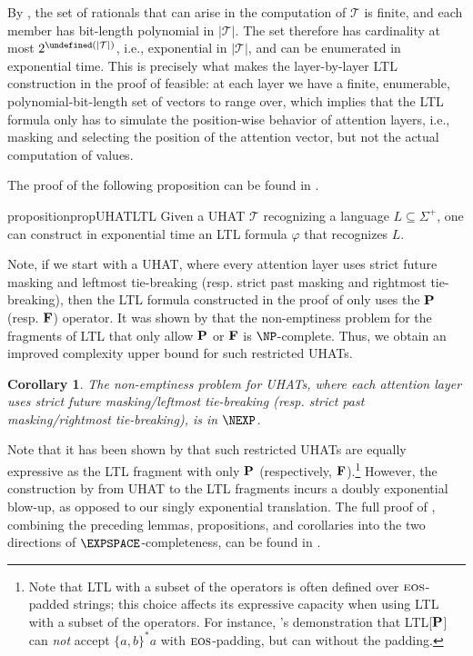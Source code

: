 \documentclass{article} %
\newtheorem{corollary}[theorem]{Corollary}
\newcommand{\opbf}[1]{\textnormal{\textbf{#1}}}
\newcommand{\past}{\opbf{P}}
\newcommand{\future}{\opbf{F}}
\let\poly\undefined
\DeclareMathOperator{\poly}{poly}
\newcommand{\alphabet}{\Sigma}
\newcommand{\trans}{\mathcal{T}}
\newcommand{\Lang}{L}
\newcommand{\citeposs}[1]{\citeauthor{#1}'s \citeyearpar{#1}}
\newcommand{\kplus}{^+}
\begin{document}
By , the set of rationals that can arise in the computation of $\trans$ is finite, and each member has bit-length polynomial in $|\trans|$.
The set therefore has cardinality at most $2^{\poly(|\trans|)}$, i.e., exponential in $|\trans|$, and can be enumerated in exponential time. 
This is precisely what makes the layer-by-layer LTL construction in the proof of  feasible: at each layer we have a finite, enumerable, polynomial-bit-length set of vectors to range over, which implies that the LTL formula only has to simulate the position-wise behavior of attention layers, i.e.,
masking and selecting the position of the attention vector,
but not the actual computation of values.

The proof of the following proposition can be found in .
\begin{restatable}[]{proposition}{propUHATLTL}\label{prop:UHAT-LTL}
Given a UHAT $\trans$ recognizing a language $\Lang \subseteq \alphabet\kplus$, one can construct in exponential time an LTL formula $\varphi$ that recognizes $\Lang$.
\end{restatable}


Note, if we start with a UHAT, where every attention layer uses strict future masking and leftmost tie-breaking (resp. strict past masking and rightmost tie-breaking),
then the LTL formula constructed in the proof of  only uses the $\past$ (resp. $\future$) operator.
It was shown by \citet{SistlaC85} that the non-emptiness problem for the fragments of LTL
that only allow $\past$ or $\future$ is $\NP$-complete.
Thus, we obtain an improved complexity upper bound for such restricted UHATs.
\begin{corollary}
The non-emptiness problem for UHATs, where each attention layer uses strict future masking/leftmost tie-breaking
(resp. strict past masking/rightmost tie-breaking), is in $\NEXP$.
\end{corollary}

Note that it has been shown by \citet{tale} that such restricted UHATs
are equally expressive as the LTL fragment with only $\past$ (respectively, $\future$).\footnote{Note that LTL with a subset of the operators is often defined over $\textsc{eos}$-padded strings; this choice affects its expressive capacity when using LTL with a subset of the operators. 
For instance, \citeposs{LC26} demonstration that LTL[$\past$] can \emph{not} accept $\{a,b\}^*a$ with $\textsc{eos}$-padding, but can without the padding.}
However, the construction by 
\citet{tale} from UHAT to the LTL fragments incurs a doubly exponential blow-up,
as opposed to our singly exponential translation. The full proof of , combining the preceding lemmas, propositions, and corollaries into the two directions of $\EXPSPACE$-completeness, can be found in .
\end{document}
